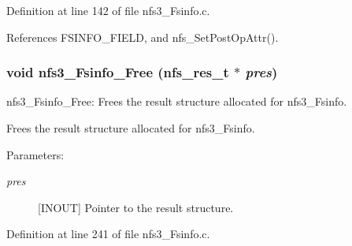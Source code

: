 Definition at line 142 of file nfs3\_\-Fsinfo.c.

References FSINFO\_\-FIELD, and nfs\_\-Set\-Post\-Op\-Attr().
\subsubsection{\setlength{\rightskip}{0pt plus 5cm}void nfs3\_\-Fsinfo\_\-Free (nfs\_\-res\_\-t $\ast$ {\em pres})}\label{nfs3__Fsinfo_8c_a2}


nfs3\_\-Fsinfo\_\-Free: Frees the result structure allocated for nfs3\_\-Fsinfo.

Frees the result structure allocated for nfs3\_\-Fsinfo.

\begin{Desc}
\item[Parameters:]
\begin{description}
\item[{\em pres}][INOUT] Pointer to the result structure. \end{description}
\end{Desc}


Definition at line 241 of file nfs3\_\-Fsinfo.c.